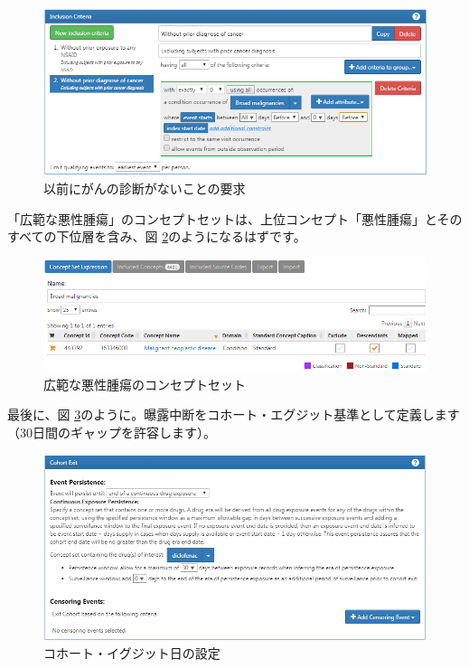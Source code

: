 \documentclass[
  11pt]{book}
\theoremstyle{definition}
\theoremstyle{definition}
\theoremstyle{definition}
\theoremstyle{definition}
\theoremstyle{remark}
\begin{document}
\begin{figure}

{\centering \includegraphics[width=1\linewidth]{images/SuggestedAnswers/cohortsAtlasInclusion2} 

}

\caption{以前にがんの診断がないことの要求}\label{fig:cohortsAtlasInclusion2}
\end{figure}

「広範な悪性腫瘍」のコンセプトセットは、上位コンセプト「悪性腫瘍」とそのすべての下位層を含み、図 \ref{fig:cohortsAtlasConceptSet3}のようになるはずです。

\begin{figure}

{\centering \includegraphics[width=1\linewidth]{images/SuggestedAnswers/cohortsAtlasConceptSet3} 

}

\caption{広範な悪性腫瘍のコンセプトセット}\label{fig:cohortsAtlasConceptSet3}
\end{figure}

最後に、図 \ref{fig:cohortsAtlasExit}のように。曝露中断をコホート・エグジット基準として定義します（30日間のギャップを許容します）。

\begin{figure}

{\centering \includegraphics[width=1\linewidth]{images/SuggestedAnswers/cohortsAtlasExit} 

}

\caption{コホート・イグジット日の設定}\label{fig:cohortsAtlasExit}
\end{figure}
\end{document}
